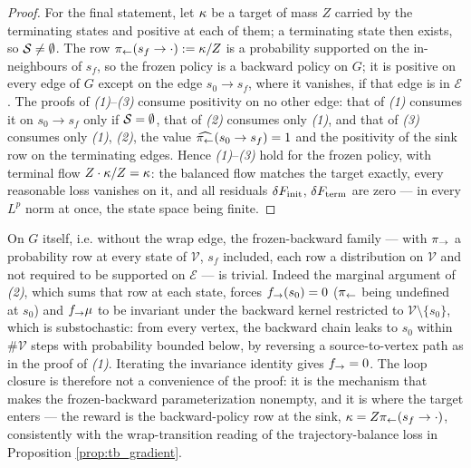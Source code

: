 \begin{proof}
For the final statement, let $\kappa$ be a target of mass $Z$ carried by the terminating states and positive at each of them; a terminating state then exists, so $\mathcal S\neq\emptyset$. The row $\pi_{\leftarrow}(s_f\rightarrow\cdot):=\kappa/Z$ is a probability supported on the in-neighbours of $s_f$, so the frozen policy is a backward policy on $G$; it is positive on every edge of $G$ except on the edge $s_0\rightarrow s_f$, where it vanishes, if that edge is in $\mathcal E$. The proofs of \emph{(1)}--\emph{(3)} consume positivity on no other edge: that of \emph{(1)} consumes it on $s_0\rightarrow s_f$ only if $\mathcal S=\emptyset$, that of \emph{(2)} consumes only \emph{(1)}, and that of \emph{(3)} consumes only \emph{(1)}, \emph{(2)}, the value $\widehat{\pi_{\leftarrow}}(s_0\rightarrow s_f)=1$ and the positivity of the sink row on the terminating edges. Hence \emph{(1)}--\emph{(3)} hold for the frozen policy, with terminal flow $Z\cdot\kappa/Z=\kappa$: the balanced flow matches the target exactly, every reasonable loss vanishes on it, and all residuals $\delta F_{\mathrm{init}}$, $\delta F_{\mathrm{term}}$ are zero --- in every $L^p$ norm at once, the state space being finite.
\end{proof}

\begin{remark}\label{rem:loop_closure_necessary}
On $G$ itself, i.e. without the wrap edge, the frozen-backward family --- with $\pi_{\rightarrow}$ a probability row at every state of $\mathcal V$, $s_f$ included, each row a distribution on $\mathcal V$ and not required to be supported on $\mathcal E$ --- is trivial. Indeed the marginal argument of \emph{(2)}, which sums that row at each state, forces $f_{\rightarrow}(s_0)=0$ ($\pi_{\leftarrow}$ being undefined at $s_0$) and $f_{\rightarrow}\mu$ to be invariant under the backward kernel restricted to $\mathcal V\setminus\{s_0\}$, which is substochastic: from every vertex, the backward chain leaks to $s_0$ within $\#\mathcal V$ steps with probability bounded below, by reversing a source-to-vertex path as in the proof of \emph{(1)}. Iterating the invariance identity gives $f_{\rightarrow} = 0$. The loop closure is therefore not a convenience of the proof: it is the mechanism that makes the frozen-backward parameterization nonempty, and it is where the target enters --- the reward is the backward-policy row at the sink, $\kappa = Z\pi_{\leftarrow}(s_f\rightarrow\cdot)$, consistently with the wrap-transition reading of the trajectory-balance loss in Proposition \ref{prop:tb_gradient}.
\end{remark}

